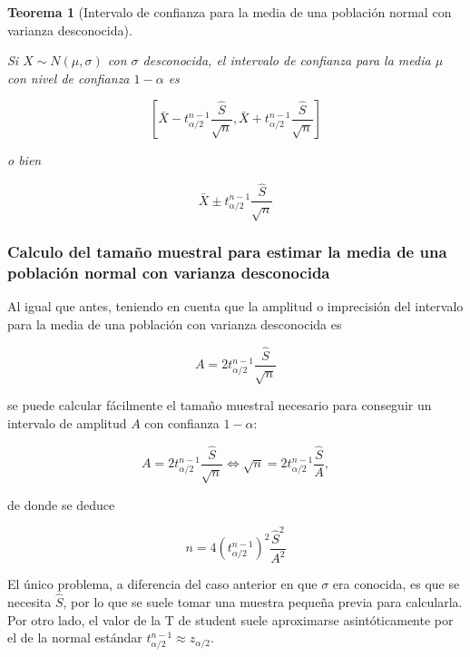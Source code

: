 \documentclass[
  a4paper,
]{scrreport}
\theoremstyle{definition}
\theoremstyle{definition}
\theoremstyle{plain}
\newtheorem{theorem}{Teorema}[chapter]
\theoremstyle{remark}
\begin{document}
\begin{theorem}[Intervalo de confianza para la media de una población
normal con varianza
desconocida]\protect\hypertarget{thm-intervalo-confianza-media-normal-varianza-desconocida}{}\label{thm-intervalo-confianza-media-normal-varianza-desconocida}

Si \(X\sim N(\mu, \sigma)\) con \(\sigma\) desconocida, el
\emph{intervalo de confianza para la media} \(\mu\) con nivel de
confianza \(1-\alpha\) es

\[
\left[\bar{X}-t^{n-1}_{\alpha/2}\frac{\hat{S}}{\sqrt{n}},\bar{X}+t^{n-1}_{\alpha/2}\frac{\hat{S}}{\sqrt{n}}\right]
\]

o bien

\[
\bar{X}\pm t^{n-1}_{\alpha/2}\frac{\hat{S}}{\sqrt{n}}
\]

\end{theorem}

\hypertarget{calculo-del-tamauxf1o-muestral-para-estimar-la-media-de-una-poblaciuxf3n-normal-con-varianza-desconocida}{%
\subsubsection{Calculo del tamaño muestral para estimar la media de una
población normal con varianza
desconocida}\label{calculo-del-tamauxf1o-muestral-para-estimar-la-media-de-una-poblaciuxf3n-normal-con-varianza-desconocida}}

Al igual que antes, teniendo en cuenta que la amplitud o imprecisión del
intervalo para la media de una población con varianza desconocida es

\[
A= 2 t^{n-1}_{\alpha/2}\frac{\hat{S}}{\sqrt{n}}
\]

se puede calcular fácilmente el tamaño muestral necesario para conseguir
un intervalo de amplitud \(A\) con confianza \(1-\alpha\):

\[
A= 2 t^{n-1}_{\alpha/2}\frac{\hat{S}}{\sqrt{n}} \Leftrightarrow \sqrt{n}= 2 t^{n-1}_{\alpha/2}\frac{\hat{S}}{A},
\]

de donde se deduce

\[
{n = 4 (t^{n-1}_{\alpha/2})^2\frac{\hat{S}^2}{A^2}}
\]

El único problema, a diferencia del caso anterior en que \(\sigma\) era
conocida, es que se necesita \(\hat{S}\), por lo que se suele tomar una
muestra pequeña previa para calcularla. Por otro lado, el valor de la T
de student suele aproximarse asintóticamente por el de la normal
estándar \(t^{n-1}_{\alpha/2}\approx z_{\alpha/2}\).
\end{document}
